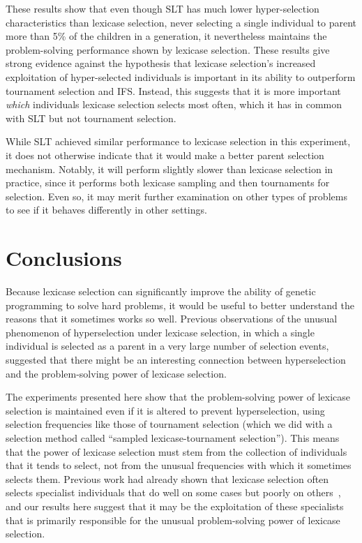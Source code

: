 \documentclass{sig-alternate}
\begin{document}
These results show that even though SLT has much lower hyper-selection characteristics than lexicase selection, never selecting a single individual to parent more than 5\% of the children in a generation, it nevertheless maintains the problem-solving performance shown by lexicase selection. These results give strong evidence against the hypothesis that lexicase selection's increased exploitation of hyper-selected individuals is important in its ability to outperform tournament selection and IFS. Instead, this suggests that it is more important \textit{which} individuals lexicase selection selects most often, which it has in common with SLT but not tournament selection.

While SLT achieved similar performance to lexicase selection in this experiment, it does not otherwise indicate that it would make a better parent selection mechanism. Notably, it will perform slightly slower than lexicase selection in practice, since it performs both lexicase sampling and then tournaments for selection. Even so, it may merit further examination on other types of problems to see if it behaves differently in other settings.


\section{Conclusions}
\label{section:conclusions}

Because lexicase selection can significantly improve the ability of genetic programming to solve hard problems, it would be useful to better understand the reasons that it sometimes works so well. Previous observations of the unusual phenomenon of hyperselection under lexicase selection, in which a single individual is selected as a parent in a very large number of selection events, suggested that there might be an interesting connection between hyperselection and the problem-solving power of lexicase selection.

The experiments presented here show that the problem-solving power of lexicase selection is maintained even if it is altered to prevent hyperselection, using selection frequencies like those of tournament selection (which we did with a selection method called ``sampled lexicase-tournament selection''). This means that the power of lexicase selection must stem from the collection of individuals that it tends to select, not from the unusual frequencies with which it sometimes selects them. Previous work had already shown that lexicase selection often selects specialist individuals that do well on some cases but poorly on others~\cite{Helmuth:2015:GPTP,Helmuth:2015:dissertation}, and our results here suggest that it may be the exploitation of these specialists that is primarily responsible for the unusual problem-solving power of lexicase selection.
\end{document}
